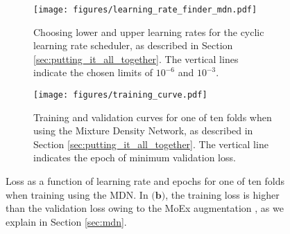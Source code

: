 \iffalse
\begin{figure*}
\begin{subfigure}{0.49\textwidth}
    \centering
    \texttt{[image: figures/learning\_rate\_finder\_mdn.pdf]}
    \caption{Choosing lower and upper learning rates for the cyclic learning rate scheduler, as described in Section \ref{sec:putting_it_all_together}. The vertical lines indicate the chosen limits of $10^{-6}$ and $10^{-3}$.}
    \label{fig:mdn_find_lr}
\end{subfigure}
\hfill
\begin{subfigure}{0.49\textwidth}
    \centering
    \texttt{[image: figures/training\_curve.pdf]}
    \caption{Training and validation curves for one of ten folds when using the Mixture Density Network, as described in Section \ref{sec:putting_it_all_together}. The vertical line indicates the epoch of minimum validation loss.}
    \label{fig:mdn_training_curve}
\end{subfigure}
\caption{Loss as a function of learning rate and epochs for one of ten folds when training using the MDN. In $\textbf{(b)}$, the training loss is higher than the validation loss owing to the MoEx augmentation \citep{moex}, as we explain in Section \ref{sec:mdn}.}
\label{fig:mdn_ancillary}
\end{figure*}

